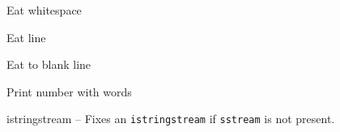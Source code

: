 \categorycontents{}

\begin{algorithm}{Eat whitespace}
\end{algorithm}
\begin{algorithm}{Eat line}
\end{algorithm}
\begin{algorithm}{Eat to blank line}
\end{algorithm}
\begin{algorithm}{Print number with words}
\end{algorithm}

\begin{algorithm}{istringstream}
-- Fixes an {\tt istringstream} if {\tt sstream} is not present.
\end{algorithm}

\begin{sourceslandscape}
\end{sourceslandscape}
